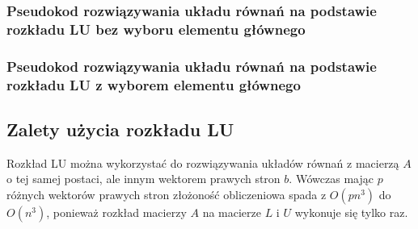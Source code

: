 \documentclass{article}
\begin{document}
\subsubsection{Pseudokod rozwiązywania układu równań na podstawie rozkładu LU bez wyboru elementu głównego}
\begin{algorithm}[H]
\end{algorithm}

\subsubsection{Pseudokod rozwiązywania układu równań na podstawie rozkładu LU z wyborem elementu głównego}
\begin{algorithm}[H]
\end{algorithm}

\subsection{Zalety użycia rozkładu LU}
Rozkład LU można wykorzystać do rozwiązywania układów równań z macierzą $A$ o tej samej postaci, ale innym wektorem prawych stron $b$.
Wówczas mając $p$ różnych wektorów prawych stron złożoność obliczeniowa spada z $O(pn^3)$ do $O(n^3)$, ponieważ rozkład macierzy $A$ na macierze $L$ i $U$ wykonuje się tylko raz.
\end{document}
